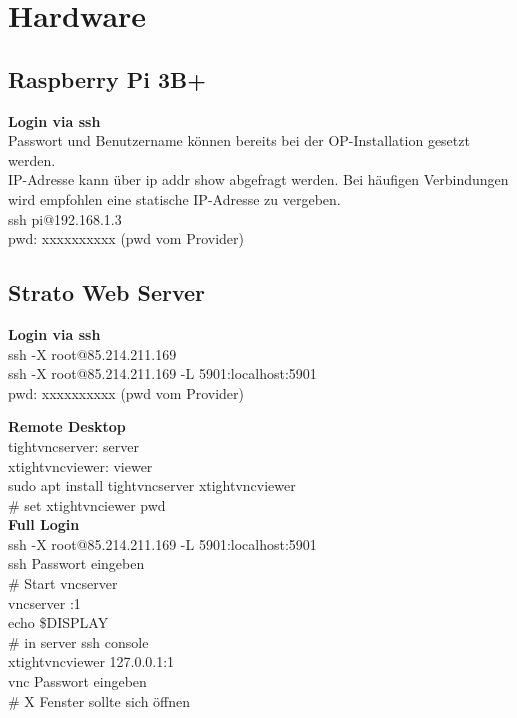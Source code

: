 \newpage
\section{Hardware}

\subsection{Raspberry Pi 3B+}
\textbf{Login via ssh}\\
Passwort und Benutzername können bereits bei der OP-Installation gesetzt werden.\\
IP-Adresse kann über ip addr show abgefragt werden. Bei häufigen Verbindungen wird empfohlen 
eine statische IP-Adresse zu vergeben.\\
ssh pi@192.168.1.3\\
pwd: xxxxxxxxxx (pwd vom Provider)

\subsection{Strato Web Server}
\textbf{Login via ssh}\\
ssh -X root@85.214.211.169\\
ssh -X root@85.214.211.169 -L 5901:localhost:5901\\
pwd: xxxxxxxxxx (pwd vom Provider)

\textbf{Remote Desktop}\\
tightvncserver: server\\
xtightvncviewer: viewer\\
sudo apt install tightvncserver xtightvncviewer\\
\# set xtightvnciewer pwd\\

\textbf{Full Login}\\
ssh -X root@85.214.211.169 -L 5901:localhost:5901\\
ssh Passwort eingeben\\
\# Start vncserver\\
vncserver :1\\
echo \grqq{}\$DISPLAY\grqq{}\\
\# in server ssh console\\
xtightvncviewer 127.0.0.1:1\\
vnc Passwort eingeben\\
\# X Fenster sollte sich öffnen\\

